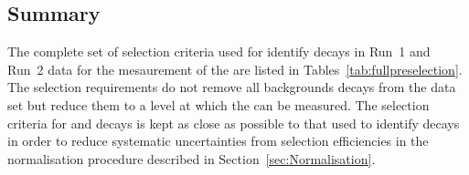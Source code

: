 \subsection{Summary}
\label{sec:BFsummary}
The complete set of selection criteria used for identify \bmumu decays in Run~1 and Run~2 data for the mesaurement of the \bmumu \BFs are listed in Tables~\ref{tab:fullpreselection}.%
The selection requirements do not remove all backgrounds decays from the data set but reduce them to a level at which the \BFs can be measured. The selection criteria for \bhh and \bujpsik decays is kept as close as possible to that used to identify \bmumu decays in order to reduce systematic uncertainties from selection efficiencies in the normalisation procedure described in Section~\ref{sec:Normalisation}. 

